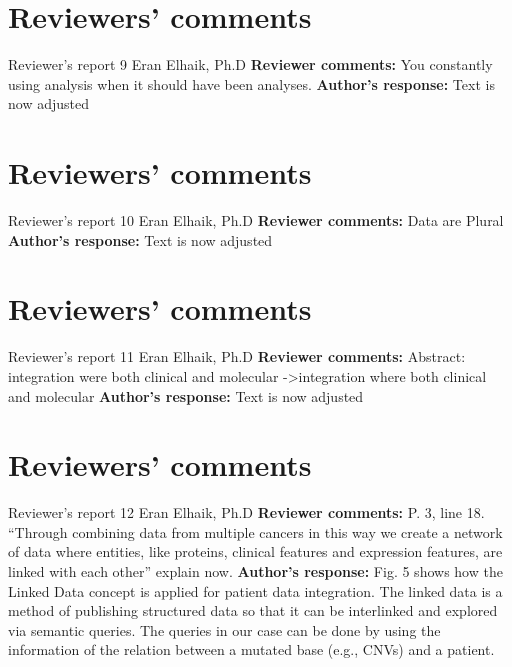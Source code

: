 \documentclass{bmcart}
\begin{document}
\begin{backmatter}
\section*{Reviewers' comments}
\newline Reviewer's report 9
\newline Eran Elhaik, Ph.D
\newline \textbf{Reviewer comments:}
You constantly using analysis when it should have been analyses.
\newline \textbf{Author's response:}
Text is now adjusted

\section*{Reviewers' comments}
\newline Reviewer's report 10
\newline Eran Elhaik, Ph.D
\newline \textbf{Reviewer comments:}
Data are Plural
\newline \textbf{Author's response:}
Text is now adjusted

\section*{Reviewers' comments}
\newline Reviewer's report 11
\newline Eran Elhaik, Ph.D
\newline \textbf{Reviewer comments:}
Abstract: integration were both clinical and molecular ->integration where both clinical and molecular
\newline \textbf{Author's response:}
Text is now adjusted

\section*{Reviewers' comments}
\newline Reviewer's report 12
\newline Eran Elhaik, Ph.D
\newline \textbf{Reviewer comments:}
P. 3, line 18. “Through combining data from multiple cancers in this way we create a network of data where entities, like proteins, clinical features and expression features, are linked with each other” explain now.
\newline \textbf{Author's response:}
Fig. 5 shows how the Linked Data concept is applied for patient data integration. The linked data is a method of publishing structured data so that it can be interlinked and explored via semantic queries. The queries in our case can be done by using the information of the relation between a mutated base (e.g., CNVs) and a patient.


\end{backmatter}
\end{document}

